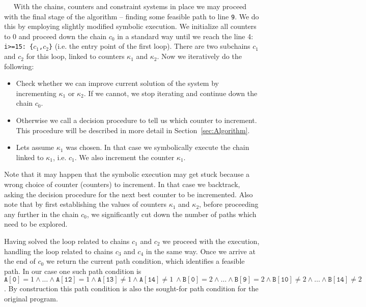 \documentclass{llncs}
\newenvironment{mitemize}{\vspace{-1\baselineskip}\begin{itemize}
\setlength{\itemsep}{0pt}}{\end{itemize}}
\renewcommand{\paragraph}[1]{\vspace{0.2cm}\noindent{\bf #1}~~}
\begin{document}
\paragraph{Phase 3: Navigating the symbolic execution}
With the chains, counters and constraint systems in place we may proceed
with the final stage of the algorithm -- finding some feasible path to line
\texttt{9}. We do this by employing slightly modified symbolic execution. We
initialize all counters to 0 and proceed down the chain $c_0$ in a standard
way until we reach the line 4: \texttt{i>=15: \{$c_1$,$c_2$\}}
(i.e. the entry point of the first loop). There are two subchains $c_1$ and $c_2$
for this loop, linked to counters $\kappa_1$ and $\kappa_2$.
Now we iteratively do the following:
\medskip

\begin{mitemize}
\item Check whether we can improve current solution of the system
  by incrementing $\kappa_1$ or $\kappa_2$. If we cannot, we stop iterating
  and continue down the chain $c_0$.
\item Otherwise we call a decision procedure to tell us which counter to
  increment. This procedure will be described in more detail in Section~\ref{sec:Algorithm}.
\item Lets assume $\kappa_1$ was chosen. In that case we symbolically
execute the chain linked to $\kappa_1$, i.e. $c_1$. We also increment the
counter $\kappa_1$.
\end{mitemize}

\noindent
Note that it may happen that the symbolic execution may get stuck because a
wrong choice of counter (counters) to increment. In
that case we backtrack, asking the decision procedure for the next best
counter to be incremented. Also note that by first establishing the values of
counters $\kappa_1$ and $\kappa_2$, before proceeding any further in the
chain $c_0$, we
significantly cut down the number of paths which need to be explored.

Having solved the loop related to chains $c_1$ and $c_2$ we proceed with the
execution, handling the loop related to chains $c_3$ and $c_4$ in the same
way. Once we arrive at the end of $c_0$ we return the current path condition,
which identifies a feasible path. In our case one such path condition is 
$\mathtt{A[0]} = 1 \wedge \ldots \wedge \mathtt{A[12]} = 1 \wedge \mathtt{A[13]} \not= 1 \wedge \mathtt{A[14]} \not= 1 ~\wedge
\mathtt{B[0]} = 2 \wedge \ldots \wedge \mathtt{B[9]} = 2 \wedge \mathtt{B[10]} \not= 2 \wedge \ldots \wedge \mathtt{B[14]} \not= 2$.
By construction this path condition is also the sought-for path condition
for the original program.
\end{document}
